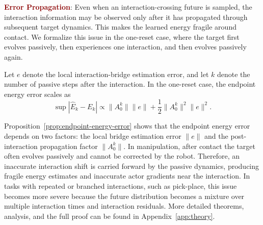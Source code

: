 \textcolor{darkred}{\textbf{Error Propagation}}: Even when an interaction-crossing future is sampled, the interaction information may be observed only after it has propagated through subsequent target dynamics.
This makes the learned energy fragile around contact.
We formalize this issue in the one-reset case, where the target first evolves passively, then experiences one interaction, and then evolves passively again.

\begin{proposition}
\label{prop:endpoint-energy-error} Let $e$ denote the local interaction-bridge estimation error, and let $k$ denote the number of passive steps after the interaction. 
In the one-reset case, the endpoint energy error scales as
\begin{equation}
    \sup|\widehat{E}_k - E_k|
    \propto
    \|A_0^k\|
    \|e\|
    +
    \frac{1}{2}
    \|A_0^k\|^2
    \|e\|^2 .
    \label{eq:energy-error-bound-main}
\end{equation}
\end{proposition}
Proposition~\ref{prop:endpoint-energy-error} shows that the endpoint energy error depends on two factors: the local bridge estimation error $\|e\|$ and the post-interaction propagation factor $\|A_0^k\|$. 
In manipulation, after contact the target often evolves passively and cannot be corrected by the robot.
Therefore, an inaccurate interaction shift is carried forward by the passive dynamics, producing fragile energy estimates and inaccurate actor gradients near the interaction.
In tasks with repeated or branched interactions, such as pick-place, this issue becomes more severe because the future distribution becomes a mixture over multiple interaction times and interaction residuals. More detailed theorems, analysis, and the full proof can be found in Appendix~\ref{app:theory}. 
